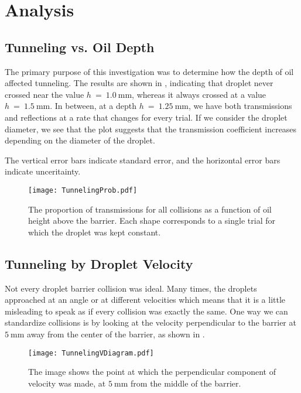 \section{Analysis}


    \subsection{Tunneling vs. Oil Depth}
The primary purpose of this investigation was to determine how the depth of oil affected tunneling. The results are shown in , indicating that droplet never crossed near the value $h~=~1.0~\mathrm{mm}$, whereas it always crossed at a value $h~=~1.5~\mathrm{mm}$. In between, at a depth $h~=~1.25~\mathrm{mm}$, we have both transmissions and reflections at a rate that changes for every trial. If we consider the droplet diameter, we see that the plot suggests that the transmission coefficient increases depending on the diameter of the droplet. 

The vertical error bars indicate standard error, and the horizontal error bars indicate unceritainty. 

\begin{figure}[h!]
	\centering
	\texttt{[image: TunnelingProb.pdf]}
	\caption{The proportion of transmissions for all collisions as a function of oil height above the barrier. Each shape corresponds to a single trial for which the droplet was kept constant.}
	\label{tbh}
\end{figure}


    \subsection{Tunneling by Droplet Velocity}
Not every droplet barrier collision was ideal. Many times, the droplets approached at an angle or at different velocities which means that it is a little misleading to speak as if every collision was exactly the same. One way we can standardize collisions is by looking at the velocity perpendicular to the barrier at $5~\mathrm{mm}$ away from the center of the barrier, as shown in .

\begin{figure}[h!]
	\centering
	\texttt{[image: TunnelingVDiagram.pdf]}
	\caption{The image shows the point at which the perpendicular component of velocity was made, at $5~\mathrm{mm}$ from the middle of the barrier.}
	\label{tvd}
\end{figure}

